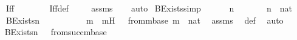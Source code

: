 \begin{isabellebody}
\ \ \ {\isachardoublequoteopen}Iff{\isacharparenleft}{\kern0pt}{\isasymphi}{\isacharcomma}{\kern0pt}\ {\isasympsi}{\isacharparenright}{\kern0pt}\ {\isasymin}\ {\isasymDelta}{}{\isachardoublequoteclose}\ \isanewline
%
\isadelimproof
\ \ %
\endisadelimproof
%
\isatagproof
{}\isamarkupfalse%
\ Iff{\isacharunderscore}{\kern0pt}def\ \isanewline
\ \ \isamarkupfalse%
\ assms\isanewline
\ \ \isamarkupfalse%
\ auto%
\endisatagproof
{\isafoldproof}%
%
\isadelimproof
\isanewline
%
\endisadelimproof
\isanewline
{}\isamarkupfalse%
\ BExists{\isacharunderscore}{\kern0pt}{\isasymDelta}{}{\isacharbrackleft}{\kern0pt}simp{\isacharbrackright}{\kern0pt}\ {\isacharcolon}{\kern0pt}\ \isanewline
\ \ \ {\isasymphi}\ n\ \isanewline
\ \ \ {\isachardoublequoteopen}{\isasymphi}\ {\isasymin}\ {\isasymDelta}{}{\isachardoublequoteclose}\ {\isachardoublequoteopen}n\ {\isasymin}\ nat{\isachardoublequoteclose}\ \isanewline
\ \ \ {\isachardoublequoteopen}BExists{\isacharparenleft}{\kern0pt}n{\isacharcomma}{\kern0pt}\ {\isasymphi}{\isacharparenright}{\kern0pt}\ {\isasymin}\ {\isasymDelta}{}{\isachardoublequoteclose}\ \isanewline
%
\isadelimproof
%
\endisadelimproof
%
\isatagproof
{}\isamarkupfalse%
\ {\isacharminus}{\kern0pt}\ \isanewline
\ \ \isamarkupfalse%
\ m\ \ mH{\isacharcolon}{\kern0pt}\ {\isachardoublequoteopen}{\isasymphi}\ {\isasymin}\ {\isasymDelta}{}{\isacharunderscore}{\kern0pt}from{\isacharcircum}{\kern0pt}m{\isacharparenleft}{\kern0pt}{\isasymDelta}{}{\isacharunderscore}{\kern0pt}base{\isacharparenright}{\kern0pt}{\isachardoublequoteclose}\ {\isachardoublequoteopen}m\ {\isasymin}\ nat{\isachardoublequoteclose}\ \isamarkupfalse%
\ assms\ \isamarkupfalse%
\ {\isasymDelta}{}{\isacharunderscore}{\kern0pt}def\ \isamarkupfalse%
\ auto\isanewline
\ \ \isamarkupfalse%
\ \isamarkupfalse%
\ {\isachardoublequoteopen}BExists{\isacharparenleft}{\kern0pt}n{\isacharcomma}{\kern0pt}\ {\isasymphi}{\isacharparenright}{\kern0pt}\ {\isasymin}\ {\isasymDelta}{}{\isacharunderscore}{\kern0pt}from{\isacharcircum}{\kern0pt}succ{\isacharparenleft}{\kern0pt}m{\isacharparenright}{\kern0pt}{\isacharparenleft}{\kern0pt}{\isasymDelta}{}{\isacharunderscore}{\kern0pt}base{\isacharparenright}{\kern0pt}{\isachardoublequoteclose}\isanewline

\end{isabellebody}
